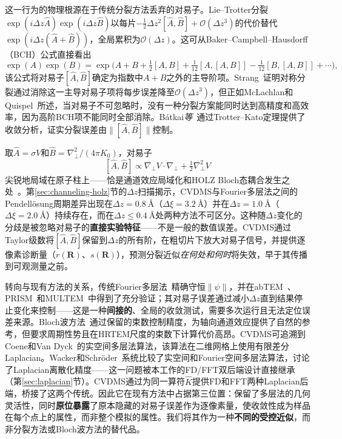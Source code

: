 \documentclass[twoside,11pt]{ctexart}
\begin{document}
这一行为的物理根源在于传统分裂方法丢弃的对易子。Lie--Trotter分裂$\exp(i\Delta z\hat A)\exp(i\Delta z\hat B)$以每片$-\tfrac12\Delta z^2[\hat A,\hat B]+\mathcal O(\Delta z^3)$的代价替代$\exp(i\Delta z(\hat A+\hat B))$，全局累积为$\mathcal O(\Delta z)$。这可从Baker--Campbell--Hausdorff（BCH）公式直接看出
\begin{equation}\label{eq:bch}
\exp(A)\exp(B)=\exp\!\big(A+B+\tfrac12[A,B]+\tfrac{1}{12}[A,[A,B]]-\tfrac{1}{12}[B,[A,B]]+\cdots\big),
\end{equation}
该公式将对易子$[\hat A,\hat B]$确定为指数中$A+B$之外的主导阶项。Strang~\cite{Strang1968}证明对称分裂通过消除这一主导对易子项将每步误差降至$\mathcal O(\Delta z^3)$，但正如McLachlan和Quispel~\cite{McLachlanQuispel2002}所述，当对易子不可忽略时，没有一种分裂方案能同时达到高精度和高效率，因为高阶BCH项不能同时全部消除。B\'atkai\textit{等}~\cite{Batkai2009}通过Trotter--Kato定理提供了收敛分析，证实分裂误差由$\|[\hat A,\hat B]\|$控制。

取$\hat A=\sigma V$和$\hat B=\nabla_\perp^2/(4\pi K_0)$，对易子
\begin{equation}\label{eq:commutator}
[\hat A,\hat B]\propto\nabla_\perp V\!\cdot\!\nabla_\perp+\tfrac12\nabla_\perp^2 V
\end{equation}
尖锐地局域在原子柱上——恰是通道效应局域化和HOLZ Bloch态耦合发生之处~\cite{ChenVanDyck1997,PennycookNellist2011}。第\ref{sec:channeling-holz}节的$\Delta z$扫描揭示，CVDMS与Fourier多层法之间的Pendell\"osung周期差异出现在$\Delta z=\SI{0.8}{\angstrom}$（$\Delta\xi=\SI{3.2}{\angstrom}$）并在$\Delta z=\SI{1.0}{\angstrom}$（$\Delta\xi=\SI{2.0}{\angstrom}$）持续存在，而在$\Delta z\le\SI{0.4}{\angstrom}$处两种方法不可区分。这种随$\Delta z$变化的分歧是被忽略对易子的\textbf{直接实验特征}——不是一般的数值误差。CVDMS通过Taylor级数将$[\hat A,\hat B]$保留到$\Delta z$的所有阶，在粗切片下放大对易子信号，并提供逐像素诊断量（$r(\mathbf{R})$、$s(\mathbf{R})$），预测分裂近似\textit{在何处和何时}将失效，早于其传播到可观测量之前。

转向与现有方法的关系，传统Fourier多层法~\cite{Kirkland2020,CowleyMoodie1957,MadsenSusi2021}精确守恒$\|\psi\|$，并在abTEM~\cite{MadsenSusi2021}、PRISM~\cite{Ophus2017}和MULTEM~\cite{LobatoVanDyck2015}中得到了充分验证；其对易子误差通过减小$\Delta z$直到结果停止变化来控制——这是一种\textbf{间接的}、全局的收敛测试，需要多次运行且无法定位误差来源。Bloch波方法~\cite{Kirkland2020}通过保留的束数控制精度，为轴向通道效应提供了自然的参考，但要求周期性势且在HRTEM尺度的束数下计算代价高昂。CVDMS可追溯到Coene和Van Dyck~\cite{CoeneVanDyck1984}的实空间多层法算法，该算法在二维网格上使用有限差分Laplacian。Wacker和Schr\"oder~\cite{WackerSchroder2015}系统比较了实空间和Fourier空间多层法算法，讨论了Laplacian离散化精度——这一问题被本工作的FD/FFT双后端设计直接继承（第\ref{sec:laplacian}节）。CVDMS通过为同一算符$\hat{K}$提供FD和FFT两种Laplacian后端，桥接了这两个传统。因此它在现有方法中占据第三位置：保留了多层法的几何灵活性，同时\textbf{原位暴露}了原本隐藏的对易子误差作为逐像素量，使收敛性成为样品在每个点上的属性，而非整个模拟的属性。我们将其作为一种\textbf{不同的受控近似}，而非分裂方法或Bloch波方法的替代品。
\end{document}
